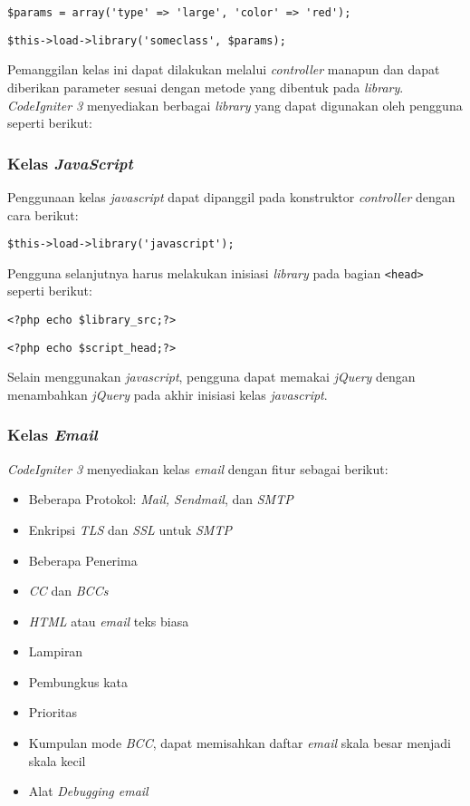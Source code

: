 \begin{center}
\verb|$params = array('type' => 'large', 'color' => 'red');|

\verb|$this->load->library('someclass', $params);|
\end{center} 

Pemanggilan kelas ini dapat dilakukan melalui \textit{controller} manapun dan dapat diberikan parameter sesuai dengan metode yang dibentuk pada \textit{library}. \textit{CodeIgniter 3} menyediakan berbagai \textit{library} yang dapat digunakan oleh pengguna seperti berikut:

\subsubsection{Kelas \textit{JavaScript}}
Penggunaan kelas \textit{javascript} dapat dipanggil pada konstruktor \textit{controller} dengan cara berikut:

\begin{center}
\verb|$this->load->library('javascript');|
\end{center}

Pengguna selanjutnya harus melakukan inisiasi \textit{library} pada bagian \verb|<head>| seperti berikut:

\begin{center}
\verb|<?php echo $library_src;?>|

\verb|<?php echo $script_head;?>|
\end{center}

Selain menggunakan \textit{javascript}, pengguna dapat memakai \textit{jQuery} dengan menambahkan \textit{jQuery} pada akhir inisiasi kelas \textit{javascript}.

\subsubsection{Kelas \textit{Email}}
\textit{CodeIgniter 3} menyediakan kelas \textit{email} dengan fitur sebagai berikut:

\begin{itemize}
\item Beberapa Protokol: \textit{Mail, Sendmail}, dan \textit{SMTP}
\item Enkripsi \textit{TLS} dan \textit{SSL} untuk \textit{SMTP}
\item Beberapa Penerima
\item \textit{CC} dan \textit{BCCs}
\item \textit{HTML} atau \textit{email} teks biasa
\item Lampiran
\item Pembungkus kata
\item Prioritas
\item Kumpulan mode \textit{BCC}, dapat memisahkan daftar \textit{email} skala besar menjadi skala kecil
\item Alat \textit{Debugging email}
\end{itemize}

